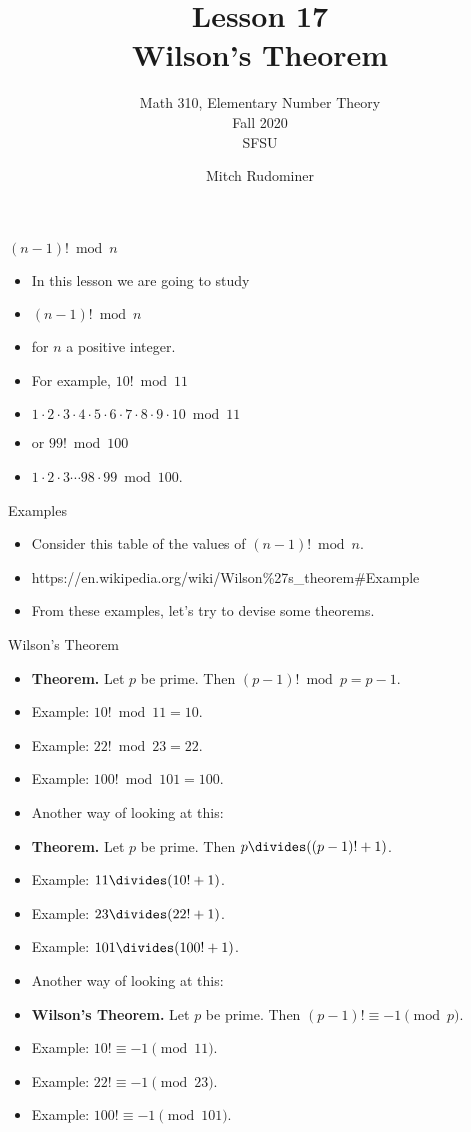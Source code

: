 \documentclass[handout]{beamer}
\title{Lesson 17 \\ Wilson's Theorem}
\subtitle{Math 310, Elementary Number Theory \\ Fall 2020 \\ SFSU}
\author{Mitch Rudominer}
\date{}
\begin{document}
\begin{frame}
  \titlepage
\end{frame}

\begin{frame}{$(n-1)! \bmod n$}

\begin{itemize}
  \item In this lesson we are going to study
  \item $(n-1)! \bmod n$
  \item for $n$ a positive integer.
  \item For example, $10! \bmod 11$
  \item $1\cdot 2\cdot 3 \cdot 4 \cdot 5 \cdot 6 \cdot 7 \cdot 8 \cdot 9 \cdot 10 \bmod 11$
  \item or $99! \bmod 100$
  \item $1\cdot 2 \cdot 3 \cdots 98 \cdot 99 \bmod 100$.
\end{itemize}

\end{frame}

\begin{frame}{Examples}

\begin{itemize}
  \item Consider this table of the values of $(n-1)! \bmod n$.
  \item https://en.wikipedia.org/wiki/Wilson\%27s\_theorem\#Example
  \item From these examples, let's try to devise some theorems.
\end{itemize}

\end{frame}

\begin{frame}{Wilson's Theorem}

\begin{itemize}
  \item \textbf{Theorem.} Let $p$ be prime. Then $(p-1)! \bmod p = p-1$.
  \item Example: $10! \bmod 11 = 10$.
  \item Example: $22! \bmod 23 = 22$.
  \item Example: $100! \bmod 101 = 100$.
  \item Another way of looking at this:
  \item \textbf{Theorem.} Let $p$ be prime. Then $p \divides ((p-1)! + 1)$.
  \item Example: $11 \divides (10!+1)$.
  \item Example: $23 \divides (22!+1)$.
  \item Example: $101 \divides (100! + 1)$.
  \item Another way of looking at this:
  \item \textbf{Wilson's Theorem.} Let $p$ be prime. Then $(p-1)! \equiv -1 \pmod p$.
  \item Example: $10! \equiv -1  \pmod {11}$.
  \item Example: $22! \equiv -1  \pmod {23}$.
  \item Example: $100! \equiv -1 \pmod {101}$.
\end{itemize}

\end{frame}
\end{document}
